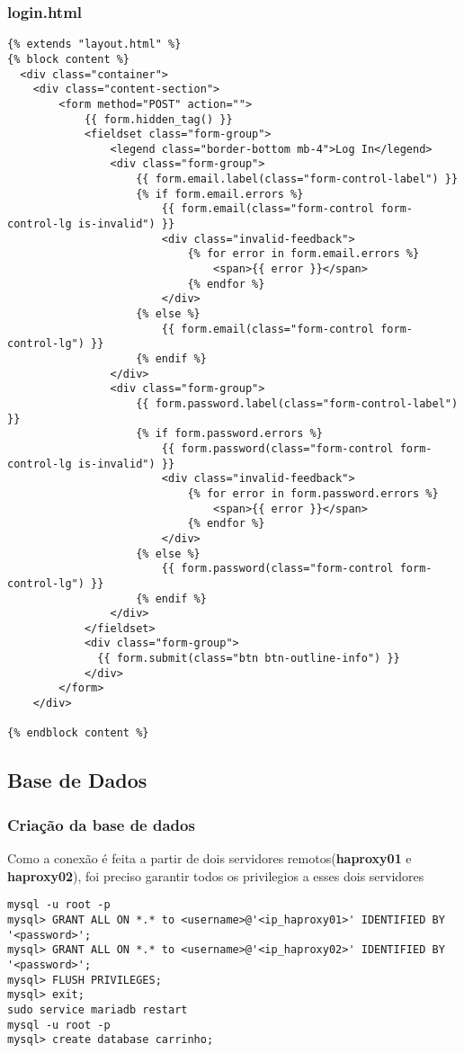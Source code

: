 \documentclass{report}
\begin{document}
\subsubsection{login.html}
\begin{lstlisting}
{% extends "layout.html" %}
{% block content %}
  <div class="container">
    <div class="content-section">
        <form method="POST" action="">
            {{ form.hidden_tag() }}
            <fieldset class="form-group">
                <legend class="border-bottom mb-4">Log In</legend>
                <div class="form-group">
                    {{ form.email.label(class="form-control-label") }}
                    {% if form.email.errors %}
                        {{ form.email(class="form-control form-control-lg is-invalid") }}
                        <div class="invalid-feedback">
                            {% for error in form.email.errors %}
                                <span>{{ error }}</span>
                            {% endfor %}
                        </div>
                    {% else %}
                        {{ form.email(class="form-control form-control-lg") }}
                    {% endif %}
                </div>
                <div class="form-group">
                    {{ form.password.label(class="form-control-label") }}
                    {% if form.password.errors %}
                        {{ form.password(class="form-control form-control-lg is-invalid") }}
                        <div class="invalid-feedback">
                            {% for error in form.password.errors %}
                                <span>{{ error }}</span>
                            {% endfor %}
                        </div>
                    {% else %}
                        {{ form.password(class="form-control form-control-lg") }}
                    {% endif %}
                </div>
            </fieldset>
            <div class="form-group">
              {{ form.submit(class="btn btn-outline-info") }}
            </div>
        </form>
    </div>

{% endblock content %}
\end{lstlisting}

\subsection{Base de Dados}
\subsubsection{Criação da base de dados}
Como a conexão é feita a partir de dois servidores remotos(\textbf{haproxy01} e \textbf{haproxy02}), foi preciso garantir todos os privilegios a esses dois servidores
\begin{lstlisting}
mysql -u root -p
mysql> GRANT ALL ON *.* to <username>@'<ip_haproxy01>' IDENTIFIED BY '<password>';
mysql> GRANT ALL ON *.* to <username>@'<ip_haproxy02>' IDENTIFIED BY '<password>';
mysql> FLUSH PRIVILEGES;
mysql> exit;
sudo service mariadb restart
mysql -u root -p
mysql> create database carrinho;
\end{lstlisting}
\end{document}
